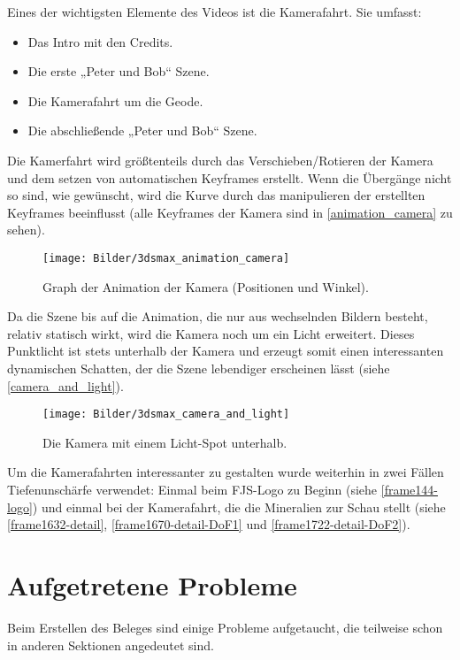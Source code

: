 \documentclass{scrreprt}
\begin{document}
Eines der wichtigsten Elemente des Videos ist die Kamerafahrt. Sie umfasst:
\begin{itemize}
\item Das Intro mit den Credits.
\item Die erste „Peter und Bob“ Szene.
\item Die Kamerafahrt um die Geode.
\item Die abschließende „Peter und Bob“ Szene.
\end{itemize}

Die Kamerfahrt wird größtenteils durch das Verschieben/Rotieren der Kamera und dem setzen von automatischen Keyframes erstellt. Wenn die Übergänge nicht so sind, wie gewünscht, wird die Kurve durch das manipulieren der erstellten Keyframes beeinflusst (alle Keyframes der Kamera sind in \autoref{animation_camera} zu sehen).

\begin{figure}[!ht]
\centering
\texttt{[image: Bilder/3dsmax\_animation\_camera]}
\caption{Graph der Animation der Kamera (Positionen und Winkel).}
\label{animation_camera}
\end{figure}

Da die Szene bis auf die Animation, die nur aus wechselnden Bildern besteht, relativ statisch wirkt, wird die Kamera noch um ein Licht erweitert. Dieses Punktlicht ist stets unterhalb der Kamera und erzeugt somit einen interessanten dynamischen Schatten, der die Szene lebendiger erscheinen lässt (siehe \autoref{camera_and_light}).

\begin{figure}[!ht]
\centering
\texttt{[image: Bilder/3dsmax\_camera\_and\_light]}
\caption{Die Kamera mit einem Licht-Spot unterhalb.}
\label{camera_and_light}
\end{figure}

Um die Kamerafahrten interessanter zu gestalten wurde weiterhin in zwei Fällen Tiefenunschärfe verwendet: Einmal beim FJS-Logo zu Beginn (siehe \autoref{frame144-logo}) und einmal bei der Kamerafahrt, die die Mineralien zur Schau stellt (siehe \autoref{frame1632-detail}, \autoref{frame1670-detail-DoF1} und \autoref{frame1722-detail-DoF2}).

\section{Aufgetretene Probleme}

Beim Erstellen des Beleges sind einige Probleme aufgetaucht, die teilweise schon in anderen Sektionen angedeutet sind.
\end{document}
